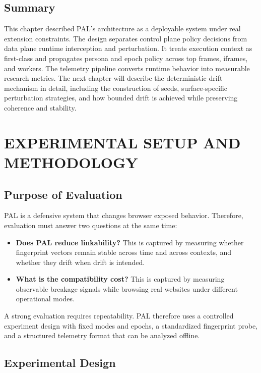 \documentclass[11pt]{report}
\begin{document}
\section{Summary}

This chapter described PAL’s architecture as a deployable system under real extension constraints. The design separates control plane policy decisions from data plane runtime interception and perturbation. It treats execution context as first-class and propagates persona and epoch policy across top frames, iframes, and workers. The telemetry pipeline converts runtime behavior into measurable research metrics. The next chapter will describe the deterministic drift mechanism in detail, including the construction of seeds, surface-specific perturbation strategies, and how bounded drift is achieved while preserving coherence and stability.








\chapter{EXPERIMENTAL SETUP AND METHODOLOGY}

\section{Purpose of Evaluation}

PAL is a defensive system that changes browser exposed behavior. Therefore, evaluation must answer two questions at the same time:

\begin{itemize}
    \item \textbf{Does PAL reduce linkability?} This is captured by measuring whether fingerprint vectors remain stable across time and across contexts, and whether they drift when drift is intended.
    \item \textbf{What is the compatibility cost?} This is captured by measuring observable breakage signals while browsing real websites under different operational modes.
\end{itemize}

A strong evaluation requires repeatability. PAL therefore uses a controlled experiment design with fixed modes and epochs, a standardized fingerprint probe, and a structured telemetry format that can be analyzed offline.

\section{Experimental Design}
\end{document}
